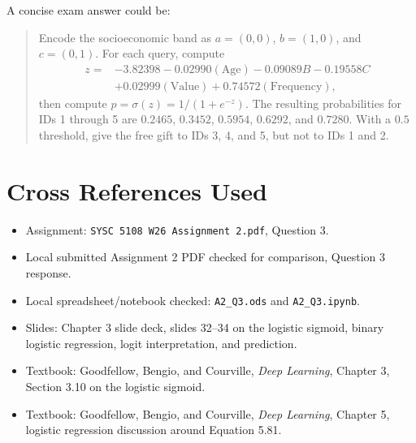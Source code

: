 \documentclass[11pt]{article}
\begin{document}
A concise exam answer could be:
\begin{quote}
Encode the socioeconomic band as $a=(0,0)$, $b=(1,0)$, and $c=(0,1)$. For each query, compute
\[
\begin{aligned}
z={}&-3.82398-0.02990(\text{Age})-0.09089B-0.19558C\\
&+0.02999(\text{Value})+0.74572(\text{Frequency}),
\end{aligned}
\]
then compute $p=\sigma(z)=1/(1+e^{-z})$. The resulting probabilities for IDs 1 through 5 are $0.2465$, $0.3452$, $0.5954$, $0.6292$, and $0.7280$. With a $0.5$ threshold, give the free gift to IDs 3, 4, and 5, but not to IDs 1 and 2.
\end{quote}

\section*{Cross References Used}

\begin{itemize}
\item Assignment: \texttt{SYSC 5108 W26 Assignment 2.pdf}, Question 3.
\item Local submitted Assignment 2 PDF checked for comparison, Question 3 response.
\item Local spreadsheet/notebook checked: \texttt{A2\_Q3.ods} and \texttt{A2\_Q3.ipynb}.
\item Slides: Chapter 3 slide deck, slides 32--34 on the logistic sigmoid, binary logistic regression, logit interpretation, and prediction.
\item Textbook: Goodfellow, Bengio, and Courville, \textit{Deep Learning}, Chapter 3, Section 3.10 on the logistic sigmoid.
\item Textbook: Goodfellow, Bengio, and Courville, \textit{Deep Learning}, Chapter 5, logistic regression discussion around Equation 5.81.
\end{itemize}
\end{document}
